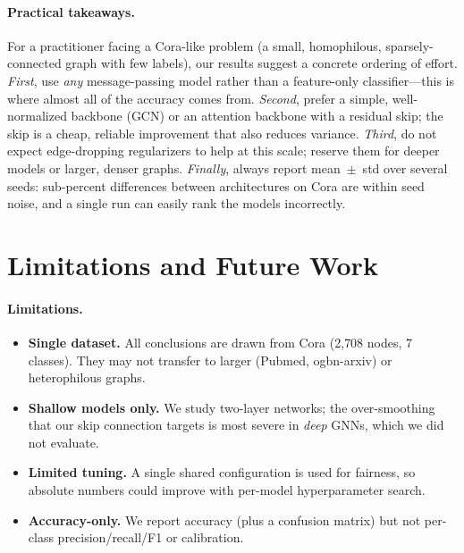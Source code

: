 \documentclass{article}
\begin{document}
\paragraph{Practical takeaways.} For a practitioner facing a Cora-like problem
(a small, homophilous, sparsely-connected graph with few labels), our results suggest a
concrete ordering of effort. \emph{First}, use \emph{any} message-passing model rather
than a feature-only classifier---this is where almost all of the accuracy comes from.
\emph{Second}, prefer a simple, well-normalized backbone (GCN) or an attention backbone
with a residual skip; the skip is a cheap, reliable improvement that also reduces
variance. \emph{Third}, do not expect edge-dropping regularizers to help at this scale;
reserve them for deeper models or larger, denser graphs. \emph{Finally}, always report
mean~$\pm$~std over several seeds: sub-percent differences between architectures on Cora
are within seed noise, and a single run can easily rank the models incorrectly.

\section{Limitations and Future Work}
\label{sec:limitations}

\paragraph{Limitations.}
\begin{itemize}
  \item \textbf{Single dataset.} All conclusions are drawn from Cora (2{,}708 nodes,
        7 classes). They may not transfer to larger (Pubmed, ogbn-arxiv) or
        heterophilous graphs.
  \item \textbf{Shallow models only.} We study two-layer networks; the over-smoothing
        that our skip connection targets is most severe in \emph{deep} GNNs, which we
        did not evaluate.
  \item \textbf{Limited tuning.} A single shared configuration is used for fairness,
        so absolute numbers could improve with per-model hyperparameter search.
  \item \textbf{Accuracy-only.} We report accuracy (plus a confusion matrix) but not
        per-class precision/recall/F1 or calibration.
\end{itemize}
\end{document}
